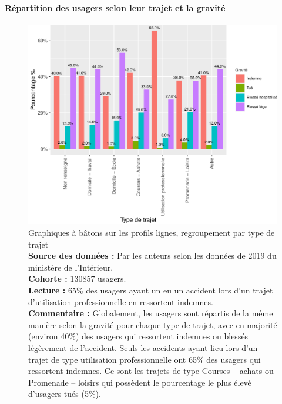 \documentclass[french,]{tp}
\let\oldparagraph\paragraph
\renewcommand{\paragraph}[1]{\oldparagraph{#1}\mbox{}}
\begin{document}
\newpage

\hypertarget{ruxe9partition-des-usagers-selon-leur-trajet-et-la-gravituxe9}{%
\paragraph{Répartition des usagers selon leur trajet et la gravité}\label{ruxe9partition-des-usagers-selon-leur-trajet-et-la-gravituxe9}}







\begin{figure}[ht!]

{\centering \includegraphics{Prediction_Gravite_files/figure-latex/barplottrajet-1} 

}

\caption{Graphiques à bâtons sur les profils lignes, regroupement par type de trajet\\
\textbf{Source des données :} Par les auteurs selon les données de 2019 du ministère de l'Intérieur.\\
\textbf{Cohorte :} 130857 usagers.\\
\textbf{Lecture :} 65\% des usagers ayant un eu un accident lors d'un trajet d'utilisation professionnelle en ressortent indemnes.\\
\textbf{Commentaire :} Globalement, les usagers sont répartis de la même manière selon la gravité pour chaque type de trajet, avec en majorité (environ 40\%) des usagers qui ressortent indemnes ou blessés légèrement de l'accident. Seuls les accidents ayant lieu lors d'un trajet de type utilisation professionnelle ont 65\% des usagers qui ressortent indemnes. Ce sont les trajets de type Courses -- achats ou Promenade -- loisirs qui possèdent le pourcentage le plus élevé d'usagers tués (5\%).}\label{fig:barplottrajet}
\end{figure}
\end{document}
